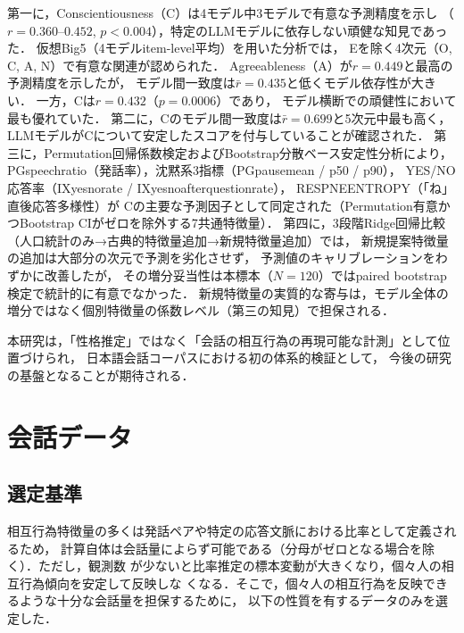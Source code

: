 \documentclass[dvipdfmx,11pt,a4paper]{bxjsarticle}
\renewcommand{\_}{\paperorigunderscore\allowbreak}%
\begin{document}
第一に，Conscientiousness（C）は4モデル中3モデルで有意な予測精度を示し
（$r = 0.360$--$0.452$, $p < 0.004$），特定のLLMモデルに依存しない頑健な知見であった．
仮想Big5（4モデルitem-level平均）を用いた分析では，
Eを除く4次元（O, C, A, N）で有意な関連が認められた．
Agreeableness（A）が$r = 0.449$と最高の予測精度を示したが，
モデル間一致度は$\bar{r} = 0.435$と低くモデル依存性が大きい．
一方，Cは$r = 0.432$（$p = 0.0006$）であり，
モデル横断での頑健性において最も優れていた．
第二に，Cのモデル間一致度は$\bar{r} = 0.699$と5次元中最も高く，
LLMモデルがCについて安定したスコアを付与していることが確認された．
第三に，Permutation回帰係数検定およびBootstrap分散ベース安定性分析により，
PG\_speech\_ratio（発話率），沈黙系3指標（PG\_pause\_mean / p50 / p90），
YES/NO応答率（IX\_yesno\_rate / IX\_yesno\_after\_question\_rate），
RESP\_NE\_ENTROPY（「ね」直後応答多様性）が
Cの主要な予測因子として同定された（Permutation有意かつBootstrap CIがゼロを除外する7共通特徴量）．
第四に，3段階Ridge回帰比較（人口統計のみ→古典的特徴量追加→新規特徴量追加）では，
新規提案特徴量の追加は大部分の次元で予測を劣化させず，
予測値のキャリブレーションをわずかに改善したが，
その増分妥当性は本標本（$N = 120$）ではpaired bootstrap検定で統計的に有意でなかった．
新規特徴量の実質的な寄与は，モデル全体の増分ではなく個別特徴量の係数レベル（第三の知見）で担保される．

本研究は，「性格推定」ではなく「会話の相互行為の再現可能な計測」として位置づけられ，
日本語会話コーパスにおける初の体系的検証として，
今後の研究の基盤となることが期待される．


\clearpage


\appendix


\section{会話データ}
\label{sec:supp_dataset}

\subsection{選定基準}
相互行為特徴量の多くは発話ペアや特定の応答文脈における比率として定義されるため，
計算自体は会話量によらず可能である（分母がゼロとなる場合を除く）．ただし，観測数
が少ないと比率推定の標本変動が大きくなり，個々人の相互行為傾向を安定して反映しな
くなる．そこで，個々人の相互行為を反映できるような十分な会話量を担保するために，
以下の性質を有するデータのみを選定した．
\end{document}
